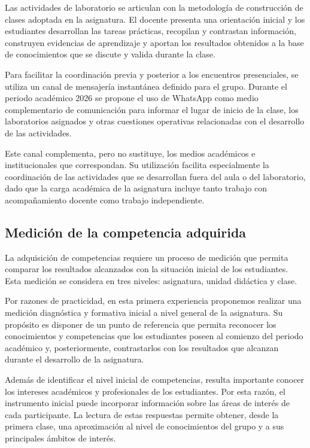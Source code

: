 \documentclass[10pt]{article}
\begin{document}
Las actividades de laboratorio se articulan con la metodología de construcción de clases adoptada en la asignatura. El docente presenta una orientación inicial y los estudiantes desarrollan las tareas prácticas, recopilan y contrastan información, construyen evidencias de aprendizaje y aportan los resultados obtenidos a la base de conocimientos que se discute y valida durante la clase.

Para facilitar la coordinación previa y posterior a los encuentros presenciales, se utiliza un canal de mensajería instantánea definido para el grupo. Durante el periodo académico 2026 se propone el uso de WhatsApp como medio complementario de comunicación para informar el lugar de inicio de la clase, los laboratorios asignados y otras cuestiones operativas relacionadas con el desarrollo de las actividades.

Este canal complementa, pero no sustituye, los medios académicos e institucionales que correspondan. Su utilización facilita especialmente la coordinación de las actividades que se desarrollan fuera del aula o del laboratorio, dado que la carga académica de la asignatura incluye tanto trabajo con acompañamiento docente como trabajo independiente.

\subsection{Medición de la competencia adquirida}

La adquisición de competencias requiere un proceso de medición que permita comparar los resultados alcanzados con la situación inicial de los estudiantes. Esta medición se considera en tres niveles: asignatura, unidad didáctica y clase.

Por razones de practicidad, en esta primera experiencia proponemos realizar una medición diagnóstica y formativa inicial a nivel general de la asignatura. Su propósito es disponer de un punto de referencia que permita reconocer los conocimientos y competencias que los estudiantes poseen al comienzo del periodo académico y, posteriormente, contrastarlos con los resultados que alcanzan durante el desarrollo de la asignatura.\parencite{armoa2026planeamiento}

Además de identificar el nivel inicial de competencias, resulta importante conocer los intereses académicos y profesionales de los estudiantes. Por esta razón, el instrumento inicial puede incorporar información sobre las áreas de interés de cada participante. La lectura de estas respuestas permite obtener, desde la primera clase, una aproximación al nivel de conocimientos del grupo y a sus principales ámbitos de interés.
\end{document}
